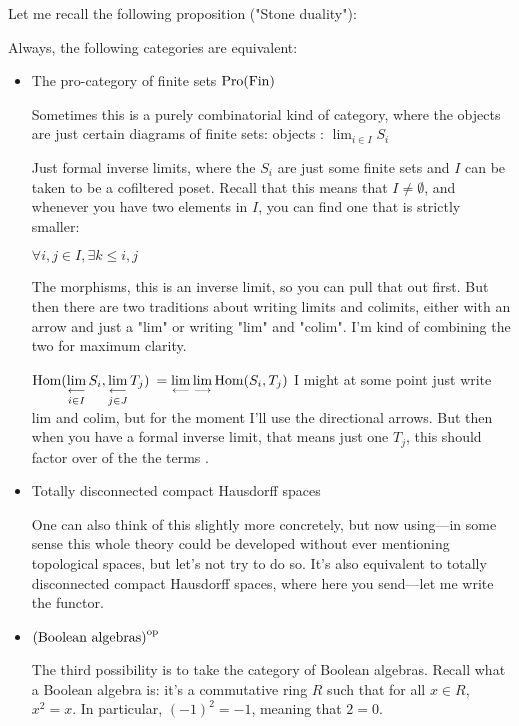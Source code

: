 \begin{proposition}
Let me recall the following proposition ("Stone duality"):

Always, the following categories are equivalent: 
\begin{itemize}
\item The pro-category of finite sets $\operatorname{Pro}(\operatorname{Fin})$

Sometimes this is a purely combinatorial kind of category, where the objects are just certain diagrams of finite sets:
objects : $\lim_{i \in I} S_i $

Just formal inverse limits, where the $S_i$ are just some finite sets and $I$ can be taken to be a cofiltered poset. Recall that this means that $I \neq \emptyset$, and whenever you have two elements in $I$, you can find one that is strictly smaller:

$\forall i, j \in I, \exists k \leq i,j$

The morphisms, this is an inverse limit, so you can pull that out first. But then there are two traditions about writing limits and colimits, either with an arrow and just a "lim" or writing "lim" and "colim". I'm kind of combining the two for maximum clarity. 

$\operatorname{Hom}(\mathop{\operatorname*{lim}\limits_{\longleftarrow}}\limits_{i \in I} S_i ,\mathop{\operatorname*{lim}\limits_{\longleftarrow}}\limits_{j \in J} T_j ) $
$ = \mathop{\operatorname*{lim}\limits_{\longleftarrow}}\limits \mathop{\operatorname*{lim}\limits_{\longrightarrow}}\limits \operatorname{Hom} (S_i, T_j)$
I might at some point just write lim and colim, but for the moment I'll use the directional arrows. But then when you have a formal inverse limit, that means just  one $T_j$, this should factor over of the the terms .

\item Totally disconnected compact Hausdorff spaces

One can also think of this slightly more concretely, but now using---in some sense this whole theory could be developed without ever mentioning topological spaces, but let's not try to do so. It's also equivalent to totally disconnected compact Hausdorff spaces, where here you send---let me write the functor. 

\item $\text{(Boolean algebras)}^{\mathrm{op}}$ 

The third possibility is to take the category of Boolean algebras. Recall what a Boolean algebra is: it's a commutative ring $R$ such that for all $x \in R$, $x^2 = x$. In particular, $(-1)^2 = -1$, meaning that $2 = 0$. 
\end{itemize}

\end{proposition}

